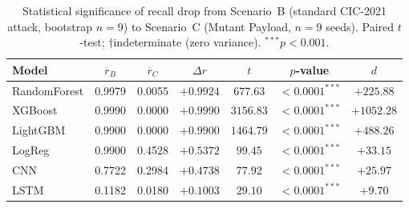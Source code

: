 \begin{table}[t]
  \centering
  \caption{Statistical significance of recall drop from
  Scenario~B (standard CIC-2021 attack, bootstrap $n{=}9$)
  to Scenario~C (Mutant Payload, $n{=}9$ seeds).
  Paired $t$-test; $\dagger$indeterminate (zero variance).
  $^{***}p{<}0.001$.}
  \label{tab:scenario_bc}
  \begin{tabular}{lcccccc}
  \toprule
  \textbf{Model} & $\overline{r}_B$ & $\overline{r}_C$ & $\Delta r$ & $t$ & $p$-value & $d$ \\
  \midrule
  RandomForest & 0.9979 & 0.0055 & $+0.9924$ & $677.63$ & $<0.0001^{***}$ & $+225.88$ \\
  XGBoost & 0.9990 & 0.0000 & $+0.9990$ & $3156.83$ & $<0.0001^{***}$ & $+1052.28$ \\
  LightGBM & 0.9900 & 0.0000 & $+0.9900$ & $1464.79$ & $<0.0001^{***}$ & $+488.26$ \\
  LogReg & 0.9900 & 0.4528 & $+0.5372$ & $99.45$ & $<0.0001^{***}$ & $+33.15$ \\
  CNN & 0.7722 & 0.2984 & $+0.4738$ & $77.92$ & $<0.0001^{***}$ & $+25.97$ \\
  LSTM & 0.1182 & 0.0180 & $+0.1003$ & $29.10$ & $<0.0001^{***}$ & $+9.70$ \\
  \bottomrule
  \end{tabular}
\end{table}